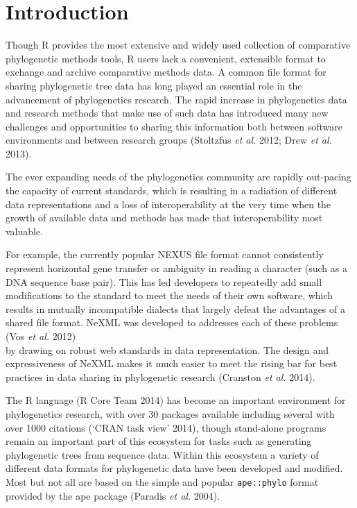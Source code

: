 \documentclass[author-year, review, 11pt]{components/elsarticle} %
\begin{document}
\section{Introduction}\label{introduction}

Though R provides the most extensive and widely used collection of
comparative phylogenetic methods tools, R users lack a convenient,
extensible format to exchange and archive comparative methods data. A
common file format for sharing phylogenetic tree data has long played an
essential role in the advancement of phylogenetics research. The rapid
increase in phylogenetics data and research methods that make use of
such data has introduced many new challenges and opportunities to
sharing this information both between software environments and between
research groups (Stoltzfus \emph{et al.} 2012; Drew \emph{et al.} 2013).

The ever expanding needs of the phylogenetics community are rapidly
out-pacing the capacity of current standards, which is resulting in a
radiation of different data representations and a loss of
interoperability at the very time when the growth of available data and
methods has made that interoperability most valuable.

For example, the currently popular NEXUS file format cannot consistently
represent horizontal gene transfer or ambiguity in reading a character
(such as a DNA sequence base pair). This has led developers to
repeatedly add small modifications to the standard to meet the needs of
their own software, which results in mutually incompatible dialects that
largely defeat the advantages of a shared file format. NeXML was
developed to addresses each of these problems (Vos \emph{et al.}
2012)\\by drawing on robust web standards in data representation. The
design and expressiveness of NeXML makes it much easier to meet the
rising bar for best practices in data sharing in phylogenetic research
(Cranston \emph{et al.} 2014).

The R language (R Core Team 2014) has become an important environment
for phylogenetics research, with over 30 packages available including
several with over 1000 citations (`CRAN task view' 2014), though
stand-alone programs remain an important part of this ecosystem for
tasks such as generating phylogenetic trees from sequence data. Within
this ecosystem a variety of different data formats for phylogenetic data
have been developed and modified. Most but not all are based on the
simple and popular \texttt{ape::phylo} format provided by the ape
package (Paradis \emph{et al.} 2004).
\end{document}

